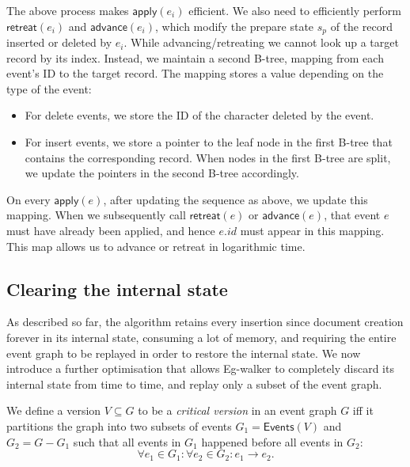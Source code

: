 \documentclass[sigplan,10pt]{acmart}
\newcommand{\algname}{Eg-walker\xspace}
\begin{document}
The above process makes $\mathsf{apply}(e_i)$ efficient.
We also need to efficiently perform $\mathsf{retreat}(e_i)$ and $\mathsf{advance}(e_i)$, which modify the prepare state $s_p$ of the record inserted or deleted by $e_i$.
While advancing/retreating we cannot look up a target record by its index. Instead, we maintain a second B-tree, mapping from each event's ID to the target record. The mapping stores a value depending on the type of the event:

\begin{itemize}
\item For delete events, we store the ID of the character deleted by the event.
\item For insert events, we store a pointer to the leaf node in the first B-tree that contains the corresponding record. When nodes in the first B-tree are split, we update the pointers in the second B-tree accordingly.
\end{itemize}

On every $\mathsf{apply}(e)$, after updating the sequence as above, we update this mapping.
When we subsequently call $\mathsf{retreat}(e)$ or $\mathsf{advance}(e)$, that event $e$ must have already been applied, and hence $e.\mathit{id}$ must appear in this mapping.
This map allows us to advance or retreat in logarithmic time.

\subsection{Clearing the internal state}\label{clearing}

As described so far, the algorithm retains every insertion since document creation forever in its internal state, consuming a lot of memory, and requiring the entire event graph to be replayed in order to restore the internal state.
We now introduce a further optimisation that allows \algname to completely discard its internal state from time to time, and replay only a subset of the event graph.

We define a version $V \subseteq G$ to be a \emph{critical version} in an event graph $G$ iff it partitions the graph into two subsets of events $G_1 = \mathsf{Events}(V)$ and $G_2 = G - G_1$ such that all events in $G_1$ happened before all events in $G_2$:
\begin{equation*}
  \forall e_1 \in G_1: \forall e_2 \in G_2: e_1 \rightarrow e_2.
\end{equation*}
\end{document}
